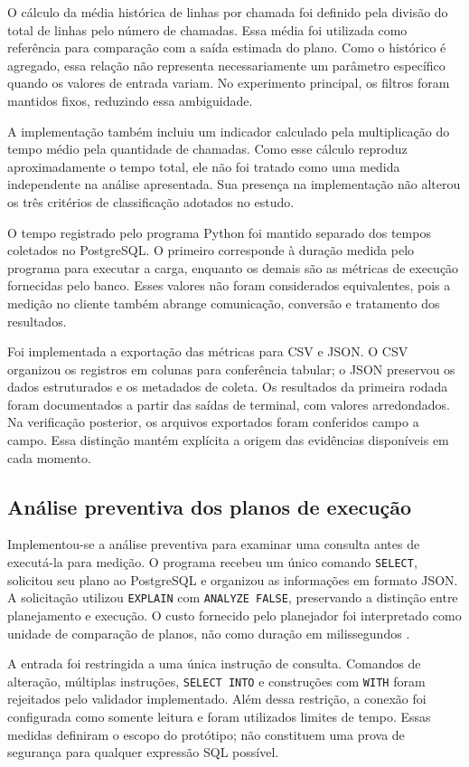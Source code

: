 \documentclass{UNESC}
\begin{document}
O cálculo da média histórica de linhas por chamada foi definido pela divisão do total de linhas pelo número de chamadas. Essa média foi utilizada como referência para comparação com a saída estimada do plano. Como o histórico é agregado, essa relação não representa necessariamente um parâmetro específico quando os valores de entrada variam. No experimento principal, os filtros foram mantidos fixos, reduzindo essa ambiguidade.

A implementação também incluiu um indicador calculado pela multiplicação do tempo médio pela quantidade de chamadas. Como esse cálculo reproduz aproximadamente o tempo total, ele não foi tratado como uma medida independente na análise apresentada. Sua presença na implementação não alterou os três critérios de classificação adotados no estudo.

O tempo registrado pelo programa Python foi mantido separado dos tempos coletados no PostgreSQL. O primeiro corresponde à duração medida pelo programa para executar a carga, enquanto os demais são as métricas de execução fornecidas pelo banco. Esses valores não foram considerados equivalentes, pois a medição no cliente também abrange comunicação, conversão e tratamento dos resultados.

Foi implementada a exportação das métricas para CSV e JSON. O CSV organizou os registros em colunas para conferência tabular; o JSON preservou os dados estruturados e os metadados de coleta. Os resultados da primeira rodada foram documentados a partir das saídas de terminal, com valores arredondados. Na verificação posterior, os arquivos exportados foram conferidos campo a campo. Essa distinção mantém explícita a origem das evidências disponíveis em cada momento.

\subsection{Análise preventiva dos planos de execução}

Implementou-se a análise preventiva para examinar uma consulta antes de executá-la para medição. O programa recebeu um único comando \texttt{SELECT}, solicitou seu plano ao PostgreSQL e organizou as informações em formato JSON. A solicitação utilizou \texttt{EXPLAIN} com \texttt{ANALYZE FALSE}, preservando a distinção entre planejamento e execução. O custo fornecido pelo planejador foi interpretado como unidade de comparação de planos, não como duração em milissegundos \cite{postgresql2026explain}.

A entrada foi restringida a uma única instrução de consulta. Comandos de alteração, múltiplas instruções, \texttt{SELECT INTO} e construções com \texttt{WITH} foram rejeitados pelo validador implementado. Além dessa restrição, a conexão foi configurada como somente leitura e foram utilizados limites de tempo. Essas medidas definiram o escopo do protótipo; não constituem uma prova de segurança para qualquer expressão SQL possível.
\end{document}
